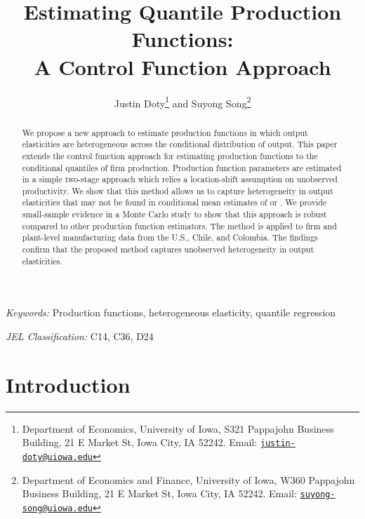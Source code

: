 \documentclass[12pt]{article}
\begin{document}
\title{Estimating Quantile Production Functions: \\
A Control Function Approach}

\author{Justin Doty\thanks{Department of Economics, University of Iowa, S321 Pappajohn Business Building, 21 E Market St, Iowa City, IA 52242. Email: \href{mailto:justin-doty@uiowa.edu}{\texttt{justin-doty@uiowa.edu}}} and Suyong Song\thanks{Department of Economics and Finance, University of Iowa, W360 Pappajohn Business Building, 21 E Market St, Iowa City, IA 52242. Email: \href{mailto:suyong-song@uiowa.edu}{\texttt{suyong-song@uiowa.edu}}}
}

\date {}
\maketitle


\begin{abstract}
We propose a new approach to estimate production functions in which output elasticities are heterogeneous across the conditional distribution of output. This paper extends the control function approach for estimating production functions to the conditional quantiles of firm production. Production function parameters are estimated in a simple two-stage approach which relies a location-shift assumption on unobserved productivity. We show that this method allows us to capture heterogeneity in output elasticities that may not be found in conditional mean estimates of \cite{Ackerberg2015} or \cite{Levinsohn2003}. We provide small-sample evidence in a Monte Carlo study to show that this approach is robust compared to other production function estimators. The method is applied to firm and plant-level manufacturing data from the U.S., Chile, and Colombia. The findings confirm that the proposed method captures unobserved heterogeneity in output elasticities.
\end{abstract}


\textit{Keywords:} Production functions, heterogeneous elasticity, quantile regression

\textit{JEL Classification:} C14, C36, D24



\baselineskip25pt

\onehalfspacing

\section{Introduction}
\end{document}
